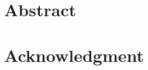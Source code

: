 \chapter{Abstract}
\label{frontmatter:abstract}


\chapter{Acknowledgment}
\label{frontmatter:acknowledgment}


